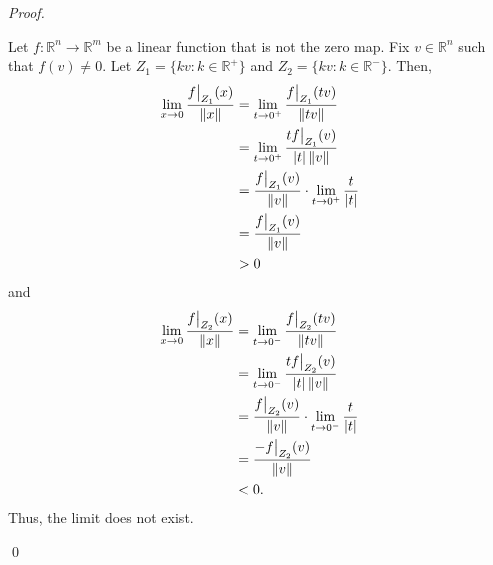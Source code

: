 \documentclass[12pt]{article}
\newenvironment{problem}[2][Problem]{\begin{trivlist}
\item[\hskip \labelsep {\bfseries #1}\hskip \labelsep {\bfseries
#2.}]}{\end{trivlist}}
\newenvironment{sol}
    {\emph{Proof.}
    }
    {
    \qed
    }
\newcommand\restr[2]{{%
  \left.\kern-\nulldelimiterspace %
  #1 %
  \vphantom{\big|} %
  \right|_{#2} %
  }}
\begin{document}
\begin{problem}{3}
\begin{itemize}
\begin{sol}
Let $f : \mathbb{R}^n \to \mathbb{R}^m$ be a linear function that is not the zero map. Fix $v \in \mathbb{R}^n$ such that $f(v) \neq 0$. Let $Z_1 = \{kv : k \in \mathbb{R}^+\}$ and $Z_2 = \{kv : k \in \mathbb{R}^-\}$. Then, \begin{align*}
    \lim_{x \to 0} \frac{\restr{f}{Z_1}(x)}{\lVert x \rVert} &= \lim_{t \to 0^+} \frac{\restr{f}{Z_1}(tv)}{\lVert t v \rVert} \\
    &= \lim_{t \to 0^+} \frac{t\restr{f}{Z_1}(v)}{\left| t \right| \lVert v \rVert} \\
    &= \frac{\restr{f}{Z_1}(v)}{\lVert v \rVert} \cdot \lim_{t \to 0^+} \frac{t}{\left| t \right|} \\ &=  \frac{\restr{f}{Z_1}(v)}{\lVert v \rVert} \\ &> 0
\end{align*} and \begin{align*}
    \lim_{x \to 0} \frac{\restr{f}{Z_2}(x)}{\lVert x \rVert} &= \lim_{t \to 0^-} \frac{\restr{f}{Z_2}(tv)}{\lVert t v \rVert} \\
    &= \lim_{t \to 0^-} \frac{t\restr{f}{Z_2}(v)}{\left| t \right| \lVert v \rVert} \\
    &= \frac{\restr{f}{Z_2}(v)}{\lVert v \rVert} \cdot \lim_{t \to 0^-} \frac{t}{\left| t \right|} \\ &=  \frac{-\restr{f}{Z_2}(v)}{\lVert v \rVert} \\ &< 0.
\end{align*}
Thus, the limit does not exist.
\end{sol}
\end{itemize}

\end{problem}
\end{document}
